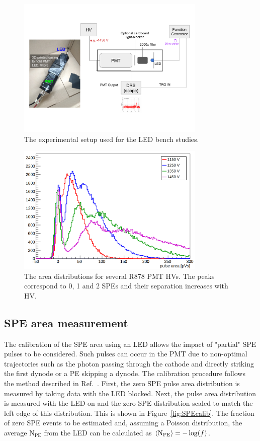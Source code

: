 \documentclass[12pt]{article}
\newcommand{\npe} {\mbox{\ensuremath{\textrm{N}_\textrm{PE}}}\xspace}
\begin{document}
\begin{figure}[ht!]
    \centering
    \includegraphics[width=0.8\textwidth]{figures/LEDsetup}
    \caption{\label{fig:LEDSetup} The experimental setup used for the LED bench studies. }
\end{figure}


\begin{figure}[ht!]
    \centering
    \includegraphics[width=0.8\textwidth]{figures/LEDareas}
    \caption{\label{fig:LEDPulseAreas} The area distributions for several R878 PMT HVs. The peaks correspond 
    to 0, 1 and 2 SPEs and their separation increases with HV.}
\end{figure}

\subsection{SPE area measurement}
\label{sec:ledarea}
The calibration of the SPE area using an LED allows the impact of "partial" SPE pulses to be considered.
Such pulses can occur in the PMT due to non-optimal trajectories such as the photon passing through the cathode and directly
striking the first dynode or a PE skipping a dynode. The calibration procedure follows the method described
in Ref.~\cite{Saldanha:2016mkn}. First, the zero SPE pulse area distribution is measured by taking data with the LED blocked.
Next, the pulse area distribution is measured with the LED on and the zero SPE distribution scaled to match the left edge of 
this distribution. This is shown in Figure~\ref{fig:SPEcalib}. The fraction of zero SPE events to be estimated and, assuming 
a Poisson distribution, the average \npe from the LED can be calculated as $\left< \npe \right> = -\log(f)$.
\end{document}
